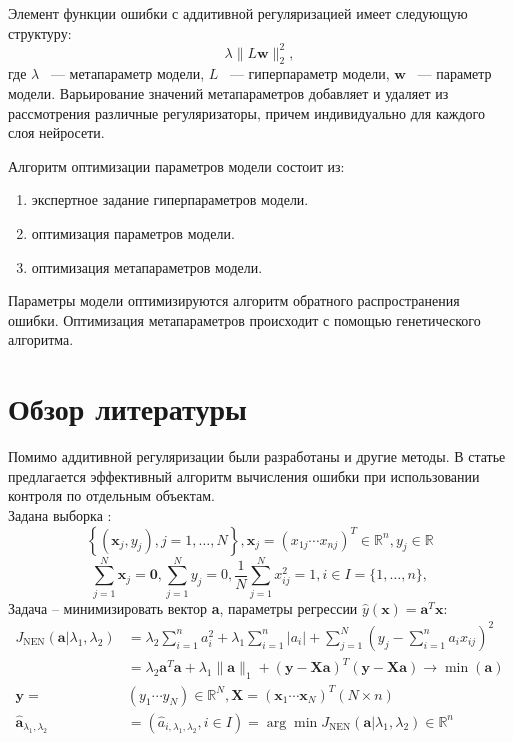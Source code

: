 \documentclass[12pt, twoside]{article}
\newcommand{\wm}{{\mathbf{w}}}
\begin{document}
Элемент функции ошибки с аддитивной регуляризацией имеет следующую структуру:
\[\lambda \|L\wm\|_2^2,\]
где $\lambda$ ~--- метапараметр модели, $L$ ~--- гиперпараметр модели, $\wm$ ~--- параметр модели. Варьирование значений метапараметров добавляет и удаляет из рассмотрения различные регуляризаторы, причем индивидуально для каждого слоя нейросети.

Алгоритм оптимизации параметров модели состоит из:
\begin{enumerate}
    \item
    экспертное задание гиперпараметров модели.
    \item 
    оптимизация параметров модели.
    \item
    оптимизация метапараметров модели.
\end{enumerate}
Параметры модели оптимизируются алгоритм обратного распространения ошибки. Оптимизация метапараметров происходит с помощью генетического алгоритма.



\section{Обзор литературы}
Помимо аддитивной регуляризации были разработаны и другие методы. В статье \cite{chernousova2014linear} предлагается эффективный алгоритм вычисления ошибки при использовании контроля по отдельным объектам.\\
Задана выборка :
\begin{equation}\label{f1}
\left\{\left(\mathbf{x}_{j}, y_{j}\right), j=1, \ldots, N\right\}, \mathbf{x}_{j}=\left(x_{1 j} \cdots x_{n j}\right)^{T} \in \mathbb{R}^{n}, y_{j} \in \mathbb{R}
\end{equation}
\begin{equation}
\sum_{j=1}^{N} \mathbf{x}_{j}=\mathbf{0}, \sum_{j=1}^{N} y_{j}=0, \frac{1}{N} \sum_{j=1}^{N} x_{i j}^{2}=1, i \in I=\{1, \ldots, n\},
\end{equation}
 Задача -- минимизировать вектор \textbf{a}, параметры регрессии $\hat{y}(\mathbf{x})=\mathbf{a}^{T} \mathbf{x}$:
\begin{equation}
\begin{aligned} J_{\mathrm{NEN}}\left(\mathbf{a} | \lambda_{1}, \lambda_{2}\right) &=\lambda_{2} \sum_{i=1}^{n} a_{i}^{2}+\lambda_{1} \sum_{i=1}^{n}\left|a_{i}\right|+\sum_{j=1}^{N}\left(y_{j}-\sum_{i=1}^{n} a_{i} x_{i j}\right)^{2} \\ &=\lambda_{2} \mathbf{a}^{T} \mathbf{a}+\lambda_{1}\|\mathbf{a}\|_{1}+(\mathbf{y}-\mathbf{X} \mathbf{a})^{T}(\mathbf{y}-\mathbf{X} \mathbf{a}) \rightarrow \min (\mathbf{a}) \\ \mathbf{y}=&\left(y_{1} \cdots y_{N}\right) \in \mathbb{R}^{N}, \mathbf{X}=\left(\mathbf{x}_{1} \cdots \mathbf{x}_{N}\right)^{T}(N \times n) \\ \hat{\mathbf{a}}_{\lambda_{1}, \lambda_{2}} &=\left(\hat{a}_{i, \lambda_{1}, \lambda_{2}}, i \in I\right)=\arg \min J_{\mathrm{NEN}}\left(\mathbf{a} | \lambda_{1}, \lambda_{2}\right) \in \mathbb{R}^{n} \end{aligned}
\end{equation}
\end{document}
